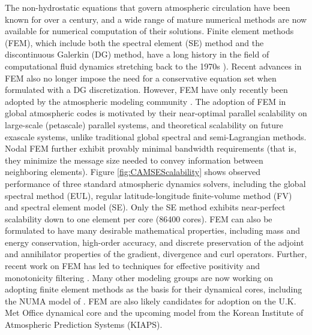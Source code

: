 \documentclass[11pt]{article}
\begin{document}
The non-hydrostatic equations that govern atmospheric circulation have been known for over a century, and a wide range of mature numerical methods are now available for numerical computation of their solutions.  Finite element methods (FEM), which include both the spectral element (SE) method and the discontinuous Galerkin (DG) method, have a long history in the field of computational fluid dynamics stretching back to the 1970s \citep{patera:84,maday:89,FBSR1997JCP,BCCWS1998JCP}).  Recent advances in FEM \citep{huynh2007flux, ullrich2014global} also no longer impose the need for a conservative equation set when formulated with a DG discretization.  However, FEM have only recently been adopted by the atmospheric modeling community \citep{taylor:97,FXGJSHTW2002JCP,FXGTER2004MWR,AFMTJT2004MWR,NTL2005MWR,FXGMR2008JCP,JFKFXG2012JCP}.  The adoption of FEM in global atmospheric codes is motivated by their near-optimal parallel scalability on large-scale (petascale) parallel systems, and theoretical scalability on future exascale systems, unlike traditional global spectral and semi-Lagrangian methods.   Nodal FEM \cite{hesthaven2007nodal} further exhibit provably minimal bandwidth requirements (that is, they minimize the message size needed to convey information between neighboring elements).  Figure \ref{fig:CAMSEScalability} shows observed performance of three standard atmospheric dynamics solvers, including the global spectral method (EUL), regular latitude-longitude finite-volume method (FV) and spectral element model (SE).  Only the SE method exhibits near-perfect scalability down to one element per core (86400 cores).  FEM can also be formulated to have many desirable mathematical properties, including mass and energy conservation, high-order accuracy, and discrete preservation of the adjoint and annihilator properties of the gradient, divergence and curl operators.  Further, recent work on FEM has led to techniques for effective positivity and monotonicity filtering \citep{OGMATASC2013}.  Many other modeling groups are now working on adopting finite element methods as the basis for their dynamical cores, including the NUMA model of \cite{JFKFXG2012JCP}.  FEM are also likely candidates for adoption on the U.K. Met Office dynamical core and the upcoming model from the Korean Institute of Atmospheric Prediction Systems (KIAPS).
\end{document}
